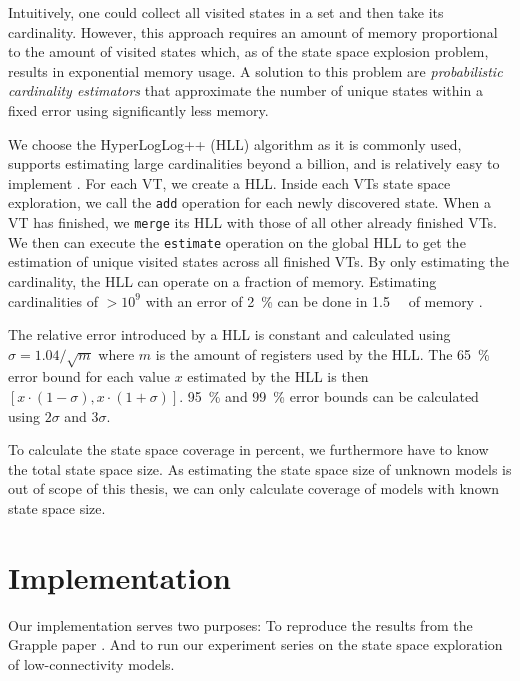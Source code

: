 \documentclass[
fancyheadings, %
%
%
]{stsreprt}
\begin{document}
Intuitively, one could collect all visited states in a set and then take its cardinality.
However, this approach requires an amount of memory proportional to the amount of visited states which, as of the state space explosion problem, results in exponential memory usage.
A solution to this problem are \emph{probabilistic cardinality estimators} that approximate the number of unique states within a fixed error using significantly less memory.

We choose the HyperLogLog++ (HLL) algorithm as it is commonly used, supports estimating large cardinalities beyond a billion, and is relatively easy to implement \cite{Heule2013.HyperLogLog++}.
For each VT, we create a HLL.
Inside each VTs state space exploration, we call the \texttt{add} operation for each newly discovered state.
When a VT has finished, we \texttt{merge} its HLL with those of all other already finished VTs.
We then can execute the \texttt{estimate} operation on the global HLL to get the estimation of unique visited states across all finished VTs.
By only estimating the cardinality, the HLL can operate on a fraction of memory.
Estimating cardinalities of $> 10^9$ with an error of \SI{2}{\percent} can be done in \SI{1.5}{\kilo\byte} of memory \cite{Flajolet2007.HyperLogLog}.

The relative error introduced by a HLL is constant and calculated using $\sigma=1.04 / \sqrt{m}$ where $m$ is the amount of registers used by the HLL.
The \SI{65}{\percent} error bound for each value $x$ estimated by the HLL is then $\left[x \cdot (1-\sigma), x \cdot (1+\sigma)\right]$.
\SI{95}{\percent} and \SI{99}{\percent} error bounds can be calculated using $2\sigma$ and $3\sigma$.

To calculate the state space coverage in percent, we furthermore have to know the total state space size.
As estimating the state space size of unknown models is out of scope of this thesis, we can only calculate coverage of models with known state space size.

\chapter{Implementation}
\label{chapter:implementation}

Our implementation serves two purposes:
To reproduce the results from the Grapple paper \cite{DeFrancisco2020.Grapple}.
And to run our experiment series on the state space exploration of low-connectivity models.
\end{document}
